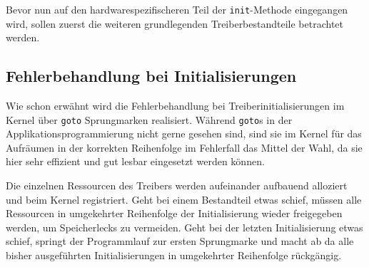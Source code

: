 Bevor nun auf den hardwarespezifischeren Teil der \texttt{init}-Methode eingegangen wird, sollen zuerst die weiteren grundlegenden Treiberbestandteile betrachtet werden. 



\subsection{Fehlerbehandlung bei Initialisierungen}
Wie schon erwähnt wird die Fehlerbehandlung bei Treiberinitialisierungen im Kernel über \texttt{goto} Sprungmarken realisiert. Während \texttt{goto}s in der Applikationsprogrammierung nicht gerne gesehen sind, sind sie im Kernel für das Aufräumen in der korrekten Reihenfolge im Fehlerfall das Mittel der Wahl, da sie hier sehr effizient und gut lesbar eingesetzt werden können. 

Die einzelnen Ressourcen des Treibers werden aufeinander aufbauend alloziert und beim Kernel registriert. Geht bei einem Bestandteil etwas schief, müssen alle Ressourcen in umgekehrter Reihenfolge der Initialisierung wieder freigegeben werden, um Speicherlecks zu vermeiden. Geht bei der letzten Initialisierung etwas schief, springt der Programmlauf zur ersten Sprungmarke und macht ab da alle bisher ausgeführten Initialisierungen in umgekehrter Reihenfolge rückgängig. 

